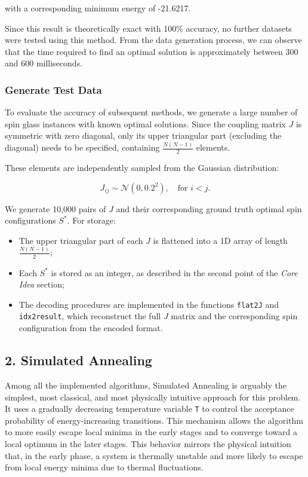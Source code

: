 \documentclass{article}
\begin{document}
with a corresponding minimum energy of -21.6217.

Since this result is theoretically exact with 100\% accuracy, no further datasets were tested using this method. From the data generation process, we can observe that the time required to find an optimal solution is approximately between 300 and 600 milliseconds.

\subsubsection*{Generate Test Data}

To evaluate the accuracy of subsequent methods, we generate a large number of spin glass instances with known optimal solutions. Since the coupling matrix $J$ is symmetric with zero diagonal, only its upper triangular part (excluding the diagonal) needs to be specified, containing $\frac{N(N-1)}{2}$ elements.

These elements are independently sampled from the Gaussian distribution:

\[J_{ij} \sim \mathcal{N}(0, 0.2^2), \quad \text{for } i < j.\]

We generate 10,000 pairs of $J$ and their corresponding ground truth optimal spin configurations $S^*$. For storage:

\begin{itemize}
    \item The upper triangular part of each $J$ is flattened into a 1D array of length $\frac{N(N-1)}{2}$;
    \item Each $S^{*}$ is stored as an integer, as described in the second point of the \textit{Core Idea} section;
    \item The decoding procedures are implemented in the functions \texttt{flat2J} and \texttt{idx2result}, which reconstruct the full $J$ matrix and the corresponding spin configuration from the encoded format.
\end{itemize}

\subsection*{2. Simulated Annealing}

Among all the implemented algorithms, Simulated Annealing is arguably the simplest, most classical, and most physically intuitive approach for this problem. It uses a gradually decreasing temperature variable \texttt{T} to control the acceptance probability of energy-increasing transitions. This mechanism allows the algorithm to more easily escape local minima in the early stages and to converge toward a local optimum in the later stages. This behavior mirrors the physical intuition that, in the early phase, a system is thermally unstable and more likely to escape from local energy minima due to thermal fluctuations.
\end{document}
